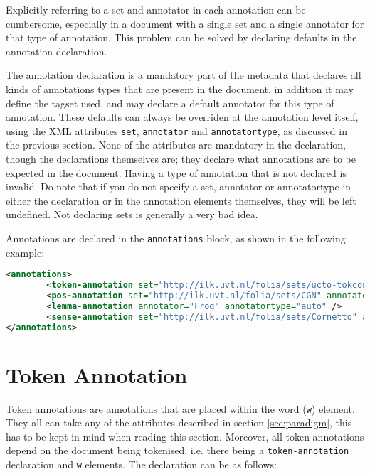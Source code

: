 \documentclass[a4paper,12pt]{report}
\begin{document}
Explicitly referring to a set and annotator in each annotation can be cumbersome, especially in a document with a single set and a single annotator for that type of annotation. This problem can be solved by declaring defaults in the annotation declaration.

The annotation declaration is a mandatory part of the metadata that declares all kinds of annotations types that are present in the document, in addition it may define the tagset used, and may declare a default annotator for this type of annotation. These defaults can always be overriden at the annotation level itself, using the XML attributes \texttt{set}, \texttt{annotator} and \texttt{annotatortype}, as discussed in the previous section. None of the attributes are mandatory in the declaration, though the declarations themselves are; they declare what annotations are to be expected in the document. Having a type of annotation that is not declared is invalid. Do note that if you do not specify a set, annotator or annotatortype in either the declaration or in the annotation elements themselves, they will be left undefined. Not declaring sets is generally a very bad idea.  

Annotations are declared in the \texttt{annotations} block, as shown in the following example:

\begin{lstlisting}[language=xml]
<annotations>
        <token-annotation set="http://ilk.uvt.nl/folia/sets/ucto-tokconfig-nl" annotator="ucto" annotatortype="auto" />
        <pos-annotation set="http://ilk.uvt.nl/folia/sets/CGN" annotator="Frog" annotatortype="auto" />
        <lemma-annotation annotator="Frog" annotatortype="auto" />    
        <sense-annotation set="http://ilk.uvt.nl/folia/sets/Cornetto" annotator="supwsd1" annotatortype="auto" />    
</annotations>
\end{lstlisting}


\section{Token Annotation}

Token annotations are annotations that are placed within the word (\texttt{w}) element. They all can take any of the attributes described in section \ref{sec:paradigm}, this has to be kept in mind when reading this section. Moreover, all token annotations depend on the document being tokenised, i.e. there being a \texttt{token-annotation} declaration and \texttt{w} elements. The declaration can be as follows:
\end{document}
